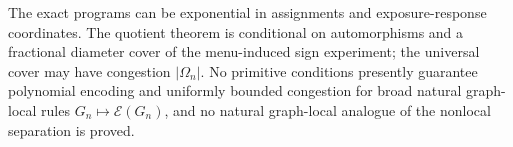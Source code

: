 The exact programs can be exponential in assignments and exposure-response coordinates. The quotient theorem is conditional on automorphisms and a fractional diameter cover of the menu-induced sign experiment; the universal cover may have congestion \(|\Omega_n|\). No primitive conditions presently guarantee polynomial encoding and uniformly bounded congestion for broad natural graph-local rules \(G_n\mapsto\mathcal E(G_n)\), and no natural graph-local analogue of the nonlocal separation is proved.